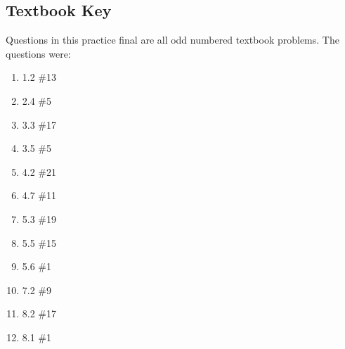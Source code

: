 \documentclass[12pt]{exam}
\begin{document}
\subsection*{Textbook Key}
Questions in this practice final are all odd numbered textbook problems. The questions were:

\begin{enumerate}
    \item 1.2 \#13
    \item 2.4 \#5
    \item 3.3 \#17
    \item 3.5 \#5
    \item 4.2 \#21
    \item 4.7 \#11
    \item 5.3 \#19 
    \item 5.5 \#15
    \item 5.6 \#1
    \item 7.2 \#9
    \item 8.2 \#17
    \item 8.1 \#1
\end{enumerate}
\end{document}
